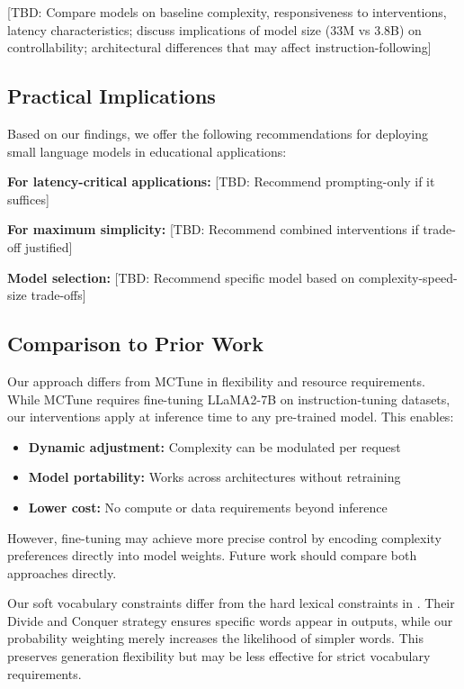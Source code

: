 \documentclass[10pt, a4paper]{article}
\begin{document}
[TBD: Compare models on baseline complexity, responsiveness to interventions, latency characteristics; discuss implications of model size (33M vs 3.8B) on controllability; architectural differences that may affect instruction-following]

\subsection{Practical Implications}

Based on our findings, we offer the following recommendations for deploying small language models in educational applications:

\textbf{For latency-critical applications:} [TBD: Recommend prompting-only if it suffices]

\textbf{For maximum simplicity:} [TBD: Recommend combined interventions if trade-off justified]

\textbf{Model selection:} [TBD: Recommend specific model based on complexity-speed-size trade-offs]

\subsection{Comparison to Prior Work}

Our approach differs from MCTune \citep{Nguyen2024} in flexibility and resource requirements. While MCTune requires fine-tuning LLaMA2-7B on instruction-tuning datasets, our interventions apply at inference time to any pre-trained model. This enables:

\begin{itemize}
\item \textbf{Dynamic adjustment:} Complexity can be modulated per request
\item \textbf{Model portability:} Works across architectures without retraining
\item \textbf{Lower cost:} No compute or data requirements beyond inference
\end{itemize}

However, fine-tuning may achieve more precise control by encoding complexity preferences directly into model weights. Future work should compare both approaches directly.

Our soft vocabulary constraints differ from the hard lexical constraints in \citet{Li2024}. Their Divide and Conquer strategy ensures specific words appear in outputs, while our probability weighting merely increases the likelihood of simpler words. This preserves generation flexibility but may be less effective for strict vocabulary requirements.
\end{document}
